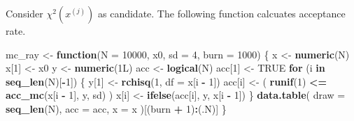 \documentclass[]{book}
\newenvironment{Shaded}{\begin{snugshade}}{\end{snugshade}}
\newcommand{\ControlFlowTok}[1]{\textcolor[rgb]{0.13,0.29,0.53}{\textbf{#1}}}
\newcommand{\DataTypeTok}[1]{\textcolor[rgb]{0.13,0.29,0.53}{#1}}
\newcommand{\DecValTok}[1]{\textcolor[rgb]{0.00,0.00,0.81}{#1}}
\newcommand{\KeywordTok}[1]{\textcolor[rgb]{0.13,0.29,0.53}{\textbf{#1}}}
\newcommand{\NormalTok}[1]{#1}
\newcommand{\OperatorTok}[1]{\textcolor[rgb]{0.81,0.36,0.00}{\textbf{#1}}}
\newcommand{\OtherTok}[1]{\textcolor[rgb]{0.56,0.35,0.01}{#1}}
\newcommand{\StringTok}[1]{\textcolor[rgb]{0.31,0.60,0.02}{#1}}
\theoremstyle{definition}
\theoremstyle{definition}
\theoremstyle{definition}
\theoremstyle{remark}
\begin{document}
Consider \(\chi^2(x^{(j)})\) as candidate. The following function calcuates acceptance rate.

\begin{Shaded}
\end{Shaded}

\begin{Shaded}
\begin{Highlighting}[]
\NormalTok{mc_ray <-}\StringTok{ }\ControlFlowTok{function}\NormalTok{(}\DataTypeTok{N =} \DecValTok{10000}\NormalTok{, x0, }\DataTypeTok{sd =} \DecValTok{4}\NormalTok{, }\DataTypeTok{burn =} \DecValTok{1000}\NormalTok{) \{}
\NormalTok{  x <-}\StringTok{ }\KeywordTok{numeric}\NormalTok{(N)}
\NormalTok{  x[}\DecValTok{1}\NormalTok{] <-}\StringTok{ }\NormalTok{x0}
\NormalTok{  y <-}\StringTok{ }\KeywordTok{numeric}\NormalTok{(1L)}
\NormalTok{  acc <-}\StringTok{ }\KeywordTok{logical}\NormalTok{(N)}
\NormalTok{  acc[}\DecValTok{1}\NormalTok{] <-}\StringTok{ }\OtherTok{TRUE}
  \ControlFlowTok{for}\NormalTok{ (i }\ControlFlowTok{in} \KeywordTok{seq_len}\NormalTok{(N)[}\OperatorTok{-}\DecValTok{1}\NormalTok{]) \{}
\NormalTok{    y[}\DecValTok{1}\NormalTok{] <-}\StringTok{ }\KeywordTok{rchisq}\NormalTok{(}\DecValTok{1}\NormalTok{, }\DataTypeTok{df =}\NormalTok{ x[i }\OperatorTok{-}\StringTok{ }\DecValTok{1}\NormalTok{])}
\NormalTok{    acc[i] <-}\StringTok{ }\NormalTok{( }\KeywordTok{runif}\NormalTok{(}\DecValTok{1}\NormalTok{) }\OperatorTok{<=}\StringTok{ }\KeywordTok{acc_mc}\NormalTok{(x[i }\OperatorTok{-}\StringTok{ }\DecValTok{1}\NormalTok{], y, sd) )}
\NormalTok{    x[i] <-}\StringTok{ }\KeywordTok{ifelse}\NormalTok{(acc[i], y, x[i }\OperatorTok{-}\StringTok{ }\DecValTok{1}\NormalTok{])}
\NormalTok{  \}}
  \KeywordTok{data.table}\NormalTok{(}
    \DataTypeTok{draw =} \KeywordTok{seq_len}\NormalTok{(N),}
    \DataTypeTok{acc =}\NormalTok{ acc,}
    \DataTypeTok{x =}\NormalTok{ x}
\NormalTok{  )[(burn }\OperatorTok{+}\StringTok{ }\DecValTok{1}\NormalTok{)}\OperatorTok{:}\NormalTok{(.N)]}
\NormalTok{\}}
\end{Highlighting}
\end{Shaded}
\end{document}
